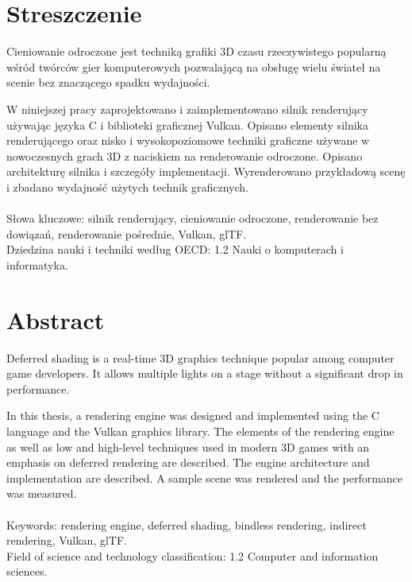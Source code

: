 \chapter*{Streszczenie}
Cieniowanie odroczone jest techniką grafiki 3D czasu rzeczywistego popularną wśród twórców gier komputerowych pozwalającą na obsługę wielu świateł na scenie bez znaczącego spadku wydajności.

W niniejszej pracy zaprojektowano i zaimplementowano silnik renderujący używając języka C i biblioteki graficznej Vulkan.
Opisano elementy silnika renderującego oraz nisko i wysokopoziomowe techniki graficzne używane w nowoczesnych grach 3D z naciskiem na renderowanie odroczone. Opisano architekturę silnika i szczegóły implementacji. Wyrenderowano przykładową scenę i zbadano wydajność użytych technik graficznych.
\\
\\
Słowa kluczowe: silnik renderujący, cieniowanie odroczone, renderowanie bez dowiązań, renderowanie pośrednie, Vulkan, glTF.
\\
Dziedzina nauki i techniki według OECD: 1.2 Nauki o komputerach i informatyka.

\chapter*{Abstract}

Deferred shading is a real-time 3D graphics technique popular among computer game developers. It allows multiple lights on a stage without a significant drop in performance.

In this thesis, a rendering engine was designed and implemented using the C language and the Vulkan graphics library.
The elements of the rendering engine as well as low and high-level techniques used in modern 3D games with an emphasis on deferred rendering are described.
The engine architecture and implementation are described.
A sample scene was rendered and the performance was measured.
\\
\\
Keywords: rendering engine, deferred shading, bindless rendering, indirect rendering, Vulkan, glTF.
\\
Field of science and technology classification: 1.2 Computer and information sciences.